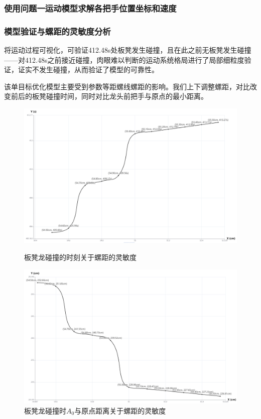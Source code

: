 \documentclass[a4paper]{article}
\begin{document}
        \subsubsection{使用问题一运动模型求解各把手位置坐标和速度}
        \subsubsection{模型验证与螺距的灵敏度分析}
        将运动过程可视化，可验证412.48s处板凳发生碰撞，且在此之前无板凳发生碰撞——对412.48s之前接近碰撞，肉眼难以判断的运动系统格局进行了局部细粒度验证，证实不发生碰撞，从而验证了模型的可靠性。

        该单目标优化模型主要受到参数等距螺线螺距的影响。我们上下调整螺距，对比改变前后的板凳碰撞时间，同时对比龙头前把手与原点的最小距离。
\begin{figure}[h]
  \centering
  \begin{minipage}[t]{0.48\textwidth}
    \centering
    \includegraphics[width=\linewidth]{image/d_t.png}
    \caption{板凳龙碰撞的时刻关于螺距的灵敏度}
    \label{fig:left}
  \end{minipage}
  \hfill %
  \begin{minipage}[t]{0.48\textwidth}
    \centering
    \includegraphics[width=\linewidth]{image/d_p.png}
    \caption{板凳龙碰撞时$A_0$与原点距离关于螺距的灵敏度}
    \label{fig:right}
  \end{minipage}
\end{figure}
\end{document}
